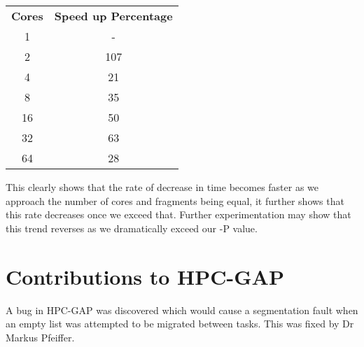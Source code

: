 \documentclass{report}
\begin{document}
\begin{table}
\begin{tabular}{cc}
\multicolumn{1}{l}{\textbf{Cores}} & \multicolumn{1}{l}{\textbf{Speed up Percentage}} \\
1                                  & -                                                \\
2                                  & 107                                              \\
4                                  & 21                                               \\
8                                  & 35                                               \\
16                                 & 50                                               \\
32                                 & 63                                               \\
64                                 & 28                                              
\end{tabular}
\end{table}

This clearly shows that the rate of decrease in time becomes faster as we approach the number of cores and fragments being equal, it further shows that this rate decreases once we exceed that. Further experimentation may show that this trend reverses as we dramatically exceed our -P value. 
\newline
{}
\section*{Contributions to HPC-GAP}
A bug in HPC-GAP was discovered which would cause a segmentation fault when an empty list was attempted to be migrated between tasks.
This was fixed by Dr Markus Pfeiffer\cite{hpcsol}.
\end{document}
